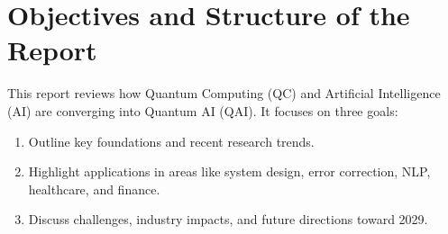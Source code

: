 \section{Objectives and Structure of the Report}
\hspace*{0.3in}This report reviews how Quantum Computing (QC) and Artificial Intelligence (AI) are converging into Quantum AI (QAI). It focuses on three goals:
\begin{enumerate}
	\item Outline key foundations and recent research trends.
	\item Highlight applications in areas like system design, error correction, NLP, healthcare, and finance.
	\item Discuss challenges, industry impacts, and future directions toward 2029.
\end{enumerate}

